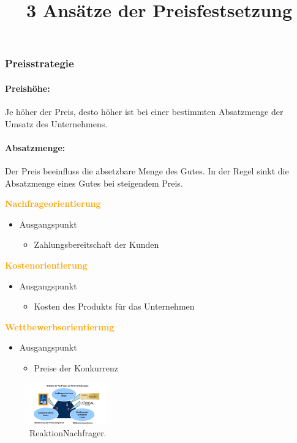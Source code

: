 \documentclass{article}
\begin{document}
\subsubsection{Preisstrategie}

\paragraph{Preishöhe: } Je höher der Preis, desto höher ist bei einer bestimmten Absatzmenge der Umsatz des Unternehmens.\\

\paragraph{Absatzmenge: } Der Preis beeinfluss die absetzbare Menge des Gutes. In der Regel sinkt die Absatzmenge eines Gutes bei steigendem Preis.

\title{3 Ansätze der Preisfestsetzung}

\begin{multicols*}{4}
\textcolor {orange} {\textbf{Nachfrageorientierung}}
\begin{itemize}
	\item Ausgangspunkt
	\begin{itemize}
		\item Zahlungsbereitschaft der Kunden
	\end{itemize}
\end{itemize}

\columnbreak

\textcolor {orange} {\textbf{Kostenorientierung}}
\begin{itemize}
	\item Ausgangspunkt
	\begin{itemize}
		\item Kosten des Produkts für das Unternehmen
	\end{itemize}
\end{itemize}

\columnbreak

\textcolor {orange} {\textbf{Wettbewerbsorientierung}}
\begin{itemize}
	\item Ausgangspunkt
	\begin{itemize}
		\item Preise der Konkurrenz
	\end{itemize}
\end{itemize}
	
\columnbreak
\begin{figure}[H]
\centering
\includegraphics[width=0.3\textwidth]{Resources/Image/ReaktionNachfrager.png}
\caption{\label{fig:ReaktionNachfrager}ReaktionNachfrager.}
\end{figure}

\end{multicols*}
\end{document}
